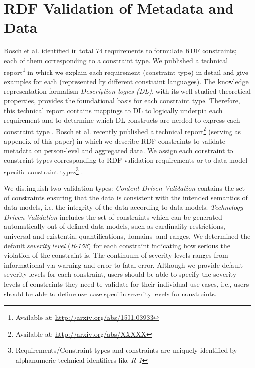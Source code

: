 \documentclass{llncs}
\newcommand{\tb}[1]{\todo[size=\small, color=green!40]{\textbf{Thomas:} #1}}
\begin{document}
\section{RDF Validation of Metadata and Data}
\label{rdf-validation}

Bosch et al. identified in total 74 requirements to formulate RDF constraints; each of them corresponding to a constraint type. 
We published a technical report\footnote{Available at: \url{http://arxiv.org/abs/1501.03933}} in which we explain each requirement (constraint type) in detail and give examples for each (represented by different constraint languages).
The knowledge representation formalism \emph{Description logics (DL)}, with its  well-studied theoretical properties, provides the foundational basis for each constraint type.
Therefore, this technical report contains mappings to DL to logically underpin each requirement and to determine which DL constructs are needed to express each constraint type \cite{BoschNolleAcarEckert2015}.
Bosch et al. recently published a technical report\footnote{Available at: \url{http://arxiv.org/abs/XXXXX}} (serving as appendix of this paper) in which we describe RDF constraints to validate metadata on person-level and aggregated data.
We assign each constraint to constraint types corresponding to RDF validation requirements or to data model specific constraint types\footnote{Requirements/Constraint types and constraints are uniquely identified by alphanumeric technical identifiers like \emph{R-1}}
\cite{BoschZapilkoWackerowEckert2015}\tb{ToDo: publish technical report}.

We distinguish two validation types:
\emph{Content-Driven Validation} contains the set of constraints ensuring that the data is consistent with the intended semantics of data models,
i.e. the integrity of the data according to data models.
\emph{Technology-Driven Validation} includes the set of constraints which can be generated automatically out of defined data models, such as cardinality restrictions, universal and existential quantifications, domains, and ranges.
We determined the default \emph{severity level} (\emph{R-158}) for each constraint indicating how serious the violation of the constraint is.
The continuum of severity levels ranges from informational via warning and error to fatal error. 
Although we provide default severity levels for each constraint, users should be able to specify the severity levels of constraints they need to validate for their individual use cases, i.e., users should be able to define use case specific severity levels for constraints.
\end{document}
